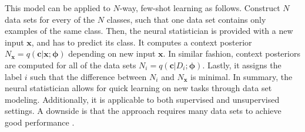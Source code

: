 This model can be applied to $N$-way, few-shot learning as follows. Construct $N$ data sets for every of the $N$ classes, such that one data set contains only examples of the same class. Then, the neural statistician is provided with a new input $\boldsymbol{x}$, and has to predict its class. It computes a context posterior $N_{\boldsymbol{x}} = q(\boldsymbol{c}|\boldsymbol{x};\boldsymbol{\phi})$ depending on new input $\boldsymbol{x}$. In similar fashion, context posteriors are computed for all of the data sets $N_{i} = q(\boldsymbol{c}|D_{i};\boldsymbol{\phi})$. Lastly, it assigns the label $i$ such that the difference between $N_{i}$ and $N_{\boldsymbol{x}}$ is minimal. 
In summary, the neural statistician  allows for quick learning on new tasks through data set modeling. Additionally, it is applicable to both supervised and unsupervised settings. A downside is that the approach requires many data sets to achieve good performance .

